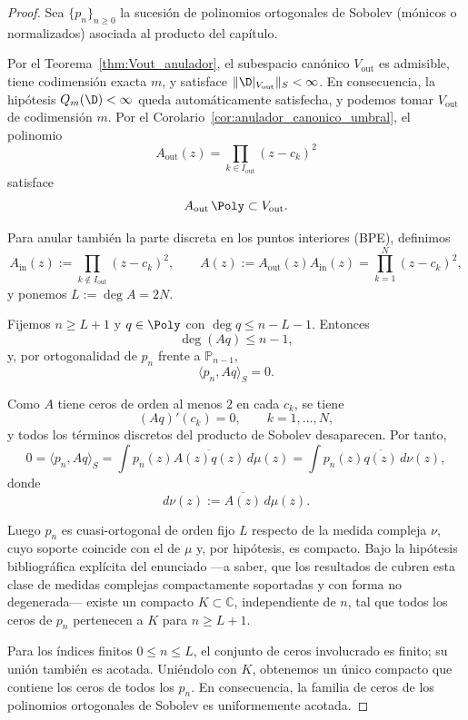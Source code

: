 \begin{proof}
	Sea $\{p_n\}_{n\ge0}$ la sucesión de polinomios ortogonales de Sobolev (mónicos o normalizados) asociada al producto del capítulo.

	Por el Teorema~\ref{thm:Vout_anulador}, el subespacio canónico
	\(
	V_{\mathrm{out}}
	\)
	es admisible, tiene codimensión exacta $m$, y satisface $\|\D|_{V_{\mathrm{out}}}\|_S<\infty$. En consecuencia, la hipótesis $Q_m(\D)<\infty$ queda automáticamente satisfecha, y podemos tomar $V_{\mathrm{out}}$
	de codimensión $m$. Por el Corolario~\ref{cor:anulador_canonico_umbral}, el polinomio
	\[
		A_{\mathrm{out}}(z)=\prod_{k\in I_{\mathrm{out}}}(z-c_k)^2
	\]
	satisface
	\[
		A_{\mathrm{out}}\,\Poly\subset V_{\mathrm{out}}.
	\]

	Para anular también la parte discreta en los puntos interiores (BPE), definimos
	\[
		A_{\mathrm{in}}(z):=\prod_{k\notin I_{\mathrm{out}}}(z-c_k)^2,
		\qquad
		A(z):=A_{\mathrm{out}}(z)A_{\mathrm{in}}(z)=\prod_{k=1}^N (z-c_k)^2,
	\]
	y ponemos $L:=\deg A=2N$.

	Fijemos $n\ge L+1$ y $q\in\Poly$ con $\deg q\le n-L-1$. Entonces
	\[
		\deg(Aq)\le n-1,
	\]
	y, por ortogonalidad de $p_n$ frente a $\mathbb P_{n-1}$,
	\[
		\langle p_n,Aq\rangle_S=0.
	\]

	Como $A$ tiene ceros de orden al menos $2$ en cada $c_k$, se tiene
	\[
		(Aq)'(c_k)=0,
		\qquad k=1,\dots,N,
	\]
	y todos los términos discretos del producto de Sobolev desaparecen. Por tanto,
	\[
		0=\langle p_n,Aq\rangle_S
		=\int p_n(z)\overline{A(z)q(z)}\,d\mu(z)
		=\int p_n(z)\overline{q(z)}\,d\nu(z),
	\]
	donde
	\[
		d\nu(z):=\overline{A(z)}\,d\mu(z).
	\]

	Luego $p_n$ es cuasi-ortogonal de orden fijo $L$ respecto de la medida compleja $\nu$, cuyo soporte coincide con el de $\mu$ y, por hipótesis, es compacto. Bajo la hipótesis bibliográfica explícita del enunciado ---a saber, que los resultados de \cite{lopez1999zero,lopez2001sobolev,marcellan2015sobolev} cubren esta clase de medidas complejas compactamente soportadas y con forma no degenerada--- existe un compacto $K\subset\mathbb C$, independiente de $n$, tal que todos los ceros de $p_n$ pertenecen a $K$ para $n\ge L+1$.

	Para los índices finitos $0\le n\le L$, el conjunto de ceros involucrado es finito; su unión también es acotada. Uniéndolo con $K$, obtenemos un único compacto que contiene los ceros de todos los $p_n$. En consecuencia, la familia de ceros de los polinomios ortogonales de Sobolev es uniformemente acotada.
\end{proof}

